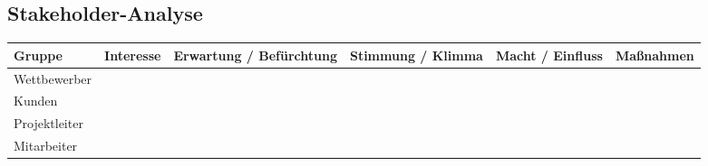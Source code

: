 

\begin{landscape}
\begin{center}
\section{Stakeholder-Analyse}


\begin{tabulary}{1.35\textwidth}{|L|L|L|L|L|L|}
\hline 
\textbf{Gruppe} & \textbf{Interesse} & \textbf{Erwartung / Befürchtung} & \textbf{Stimmung / Klimma} & \textbf{Macht / Einfluss} & \textbf{Maßnahmen} \\ 
\hline 
Wettbewerber &&&&&\\ 
\hline 
Kunden &&&&&\\ 
\hline 
Projektleiter &&&&& \\ 
\hline 
Mitarbeiter &&&&& \\ 
\hline 
\end{tabulary} 
\end{center}
\end{landscape}
\restoregeometry